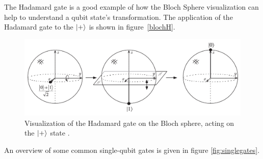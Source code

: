 The Hadamard gate is a good example of how the Bloch Sphere visualization can help to understand a qubit state's transformation. The application of the Hadamard gate to the $\Ket{+}$ is shown in figure~\ref{blochH}.

\begin{figure}[H]
  \centering
  \label{fig:blochH}
  \includegraphics[width=\textwidth]{figures/hadamard}
  \caption[Hadamard Visualization]{Visualization of the Hadamard gate on the Bloch sphere, acting on the $\Ket{+}$ state \cite{nielsen2002quantum}.}
\end{figure}

An overview of some common single-qubit gates is given in figure \ref{fig:singlegates}.

